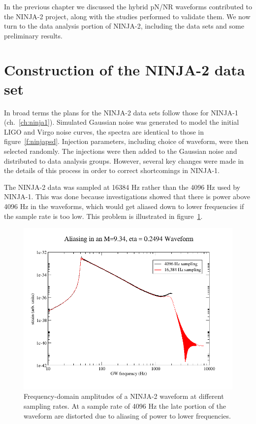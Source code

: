 In the previous chapter we discussed the hybrid pN/NR waveforms
contributed to the NINJA-2 project, along with the studies performed
to validate them.  We now turn to the data analysis portion of
NINJA-2, including the data sets and some preliminary results.

\section{Construction of the NINJA-2 data set}

In broad terms the plans for the NINJA-2 data sets follow those for
NINJA-1 (ch.~\ref{ch:ninja1}).  Simulated Gaussian noise was generated
to model the initial LIGO and Virgo noise curves, the spectra are
identical to those in figure~\ref{f:ninjapsd}.  Injection parameters,
including choice of waveform, were then selected randomly.  The
injections were then added to the Gaussian noise and distributed to
data analysis groups.  However, several key changes were made in the
details of this process in order to correct shortcomings in NINJA-1.  

The NINJA-2 data was sampled at 16384 Hz rather than the 4096 Hz used
by NINJA-1.  This was done because investigations showed that there is
power above 4096 Hz in the waveforms, which would get aliased down to 
lower frequencies if the sample rate is too low.  This problem is
illustrated in figure~\ref{f:ninja2_aliasing}.

\begin{figure}
  \includegraphics[width=\linewidth]{figures/ninja2_results/ninja2_aliasing}
  \caption[Aliasing of waveform power]{
  \label{f:ninja2_aliasing}
Frequency-domain amplitudes of a NINJA-2 waveform at different
sampling rates.  At a sample rate of 4096 Hz the late portion of the
waveform are distorted due to aliasing of power to lower frequencies.
}
\end{figure}%

